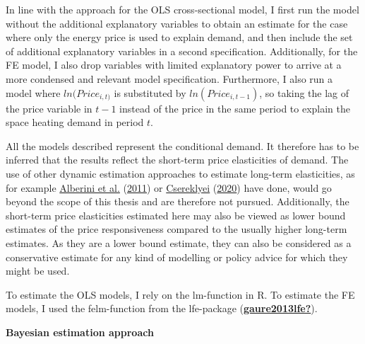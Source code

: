 \documentclass[12pt,twoside]{reedthesis}
\begin{document}
In line with the approach for the OLS cross-sectional model, I first run the model without the additional explanatory variables to obtain an estimate for the case where only the energy price is used to explain demand, and then include the set of additional explanatory variables in a second specification. Additionally, for the FE model, I also drop variables with limited explanatory power to arrive at a more condensed and relevant model specification. Furthermore, I also run a model where \(ln(Price_{i,t)}\) is substituted by \(ln(Price_{i,t-1})\), so taking the lag of the price variable in \(t-1\) instead of the price in the same period to explain the space heating demand in period \(t\).

All the models described represent the conditional demand. It therefore has to be inferred that the results reflect the short-term price elasticities of demand. The use of other dynamic estimation approaches to estimate long-term elasticities, as for example \protect\hyperlink{ref-alberini_etal11}{Alberini et al.} (\protect\hyperlink{ref-alberini_etal11}{2011}) or \protect\hyperlink{ref-csereklyei20}{Csereklyei} (\protect\hyperlink{ref-csereklyei20}{2020}) have done, would go beyond the scope of this thesis and are therefore not pursued. Additionally, the short-term price elasticities estimated here may also be viewed as lower bound estimates of the price responsiveness compared to the usually higher long-term estimates. As they are a lower bound estimate, they can also be considered as a conservative estimate for any kind of modelling or policy advice for which they might be used.

To estimate the OLS models, I rely on the lm-function in R. To estimate the FE models, I used the felm-function from the lfe-package (\protect\hyperlink{ref-gaure2013lfe}{\textbf{gaure2013lfe?}}).

\textbf{Bayesian estimation approach}
\end{document}
